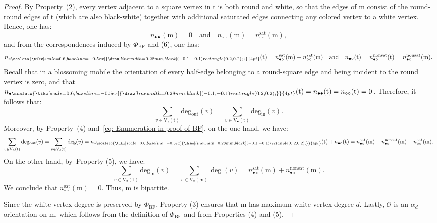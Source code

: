\documentclass[11pt,reqno,tbtags]{amsart}
\newcommand{\rV}{\mathrm{V}}
\renewcommand{\rm}{\mathrm{m}}
\newcommand{\rt}{\mathrm{t}}
\numberwithin{equation}{section}
\numberwithin{theo}{section}
\theoremstyle{definition}
\newcommand{\cO}{\mathcal{O}}
\newcommand{\out}{\mathrm{deg_{out}}}
\newcommand{\ind}{\mathrm{deg_{in}}}
\newcommand{\halfsquareempty}{
  \tikz[scale=0.6, baseline=-0.5ex]{
    \draw[line width=0.28mm, black] (-0.1,-0.1) rectangle (0.2,0.2);}}
\newcommand{\sqempt}{{\scaleto{\halfsquareempty}{4pt}}}
\begin{document}
\begin{proof}
By Property~(2), every vertex adjacent to a square vertex in $\rt$ is both round and white, so that the edges of $\rm$ consist of the round-round edges of $\rt$ (which are also black-white) together with additional saturated edges connecting any colored vertex to a white vertex. Hence, one has:
\begin{equation*}
	n_{\bullet\bullet}(\rm)=0
	\quad \text{and} \quad 
	n_{\circ\circ}(\rm)=n^{\mathrm{sat}}_{\circ\circ}(\rm),
\end{equation*}
and from the correspondences induced by $\Phi_{\mathrm{BF}}$ and (6), one has:
\begin{equation}\label{eq: Enumeration in proof of BF}
	n_{\circ\sqempt}(\rt) = n^{\mathrm{sat}}_{\bullet\circ}(\rm) + n^{\mathrm{sat}}_{\circ\circ}(\rm)  \quad \text{and} \quad  n_{\bullet\circ}(\rt) = n^{\mathrm{nonsat}}_{\bullet\circ}(\rt) =  n^{\mathrm{nonsat}}_{\bullet\circ}(\rm) .
\end{equation}
Recall that in a blossoming mobile the orientation of every half-edge belonging to a round-square edge and being incident to the round vertex is zero, and that $n_{\bullet\sqempt}(\rt)=n_{\bullet\bullet}(\rt)=n_{\circ\circ}(\rt)=0$. Therefore, it follows that:
\begin{equation}\label{eq:degout_deginn}
	\sum\limits_{v\in \rV_\circ(\rt)}{\out(v)} =\sum\limits_{v\in \rV_\bullet(\rt)}{\ind(v)}.
\end{equation}
Moreover, by Property~(4) and~\eqref{eq: Enumeration in proof of BF}, on the one hand, we have: 
\begin{equation*}
	\sum\limits_{v\in \rV_\circ(\rt)}{\out(v)} = \sum\limits_{v\in \rV_\circ(\rt)}{\deg(v)} = n_{\circ\sqempt}(\rt) + n_{\bullet\circ}(\rt) =  n^{\mathrm{sat}}_{\bullet\circ}(\rm) +  n^{\mathrm{nonsat}}_{\bullet\circ}(\rm) + n^{\mathrm{sat}}_{\circ\circ}(\rm).
\end{equation*}
On the other hand, by~Property (5), we have:
\begin{equation*}
	\sum\limits_{v\in \rV_\bullet(\rt)}{\ind(v)} = \sum\limits_{v\in \rV_\bullet(\rm)}{\deg(v)} = n^{\mathrm{sat}}_{\bullet\circ}(\rm) + n^{\mathrm{nonsat}}_{\bullet\circ}(\rm).
\end{equation*}
We conclude that $n^{\mathrm{sat}}_{\circ\circ}(\rm)=0$. Thus, $\rm$ is bipartite. 

Since the white vertex degree is preserved by $\Phi_{\mathrm{BF}}$, Property (3) ensures that $\rm$ has maximum white vertex degree $d$. 
Lastly, $\cO$ is an $\alpha_d$-orientation on $\rm$, which follows from the definition of $\Phi_{\mathrm{BF}}$ and from Properties (4) and (5). 
\end{proof}
\end{document}
